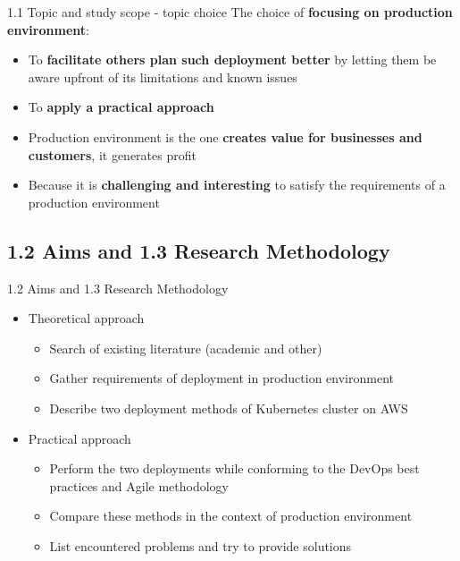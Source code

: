 \documentclass{beamer}
\begin{document}
\begin{frame}{1.1 Topic and study scope - topic choice}%
The choice of \textbf{focusing on production environment}:
	\begin{itemize}
		\item To \textbf{facilitate others plan such deployment better} by letting them be aware upfront of its limitations and known issues
		\item To \textbf{apply a practical approach}
		\item Production environment is the one \textbf{creates value for businesses and customers}, it generates profit
		\item Because it is \textbf{challenging and interesting} to satisfy the requirements of a production environment
	\end{itemize}
\end{frame}


\subsection{1.2 Aims and 1.3 Research Methodology}
\begin{frame}{1.2 Aims and 1.3 Research Methodology}%
	\begin{itemize}
		\item Theoretical approach
		\begin{itemize}
			\item Search of existing literature (academic and other)
			\item Gather requirements of deployment in production environment
			\item Describe two deployment methods of Kubernetes cluster on AWS
		\end{itemize}
		\item Practical approach
		\begin{itemize}
			\item Perform the two deployments while conforming to the DevOps best practices and Agile methodology
			\item Compare these methods in the context of production environment
			\item List encountered problems and try to provide solutions
		\end{itemize}
	\end{itemize}
\end{frame}
\end{document}
